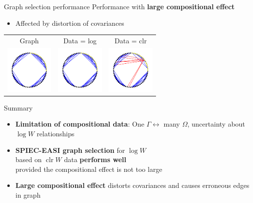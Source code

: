 \documentclass[professionalfonts]{beamer}
\newcommand{\clr}{\operatorname{clr}}
\begin{document}
\begin{frame}{Graph selection performance}
Performance with \textbf{large compositional effect}
\begin{itemize}
\item Affected by distortion of covariances
\end{itemize}
\begin{center}
\begin{tabular}{ccc}
Graph & Data = log & Data = clr \\
\includegraphics[width=90px]{figs/cluster-graph.pdf} &
\includegraphics[width=90px]{figs/cluster-log.pdf} &
\includegraphics[width=90px]{figs/cluster-clr.pdf}
\end{tabular}
\vspace{3em}
\end{center}
\end{frame}

\begin{frame}{Summary}
\begin{itemize}
\item \textbf{Limitation of compositional data}: One $\Gamma \leftrightarrow$ many $\Omega$, uncertainty about $\log W$ relationships
\item \textbf{SPIEC-EASI graph selection} for $\log W$ \\ based on $\clr W$ data \textbf{performs well} \textellipsis \\ provided the compositional effect is not too large
\item \textbf{Large compositional effect} distorts covariances and causes erroneous edges in graph
\end{itemize}
\end{frame}
\end{document}
